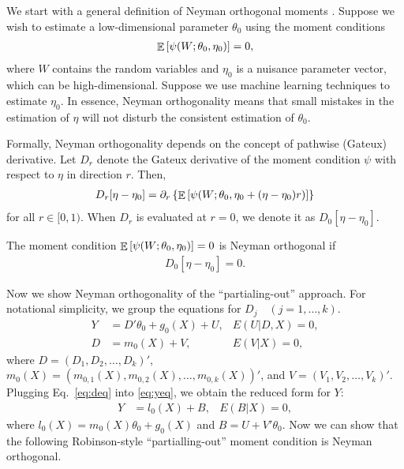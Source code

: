 \documentclass[11pt]{article}
\begin{document}
We start with a general definition of Neyman orthogonal moments  \cite[see, e.g.,][Definition 2.1]{cherno/etal:18}. Suppose we wish to estimate a low-dimensional parameter $\theta_0$ using the moment
conditions
\begin{align}
  \mathop{\mathbb{E}} \left [ \psi(W; \theta_0, \eta_0) \right ] = 0,
\end{align}
where $W$ contains the random variables and  $\eta_0$ is a nuisance parameter vector, which can be high-dimensional. Suppose we
use machine learning techniques to estimate $\eta_0$. In essence,  Neyman orthogonality means that
small mistakes in the estimation of $\eta$ will not disturb the consistent
estimation of $\theta_0$.

Formally, Neyman orthogonality depends on the concept of pathwise (Gateux)
derivative. Let $D_r$ denote the Gateux derivative of the moment condition $\psi$ with respect to $\eta$ in direction $r$. Then, 
\begin{align}
  D_r [\eta - \eta_0] = \partial_r \left\{ 
    	\mathop{\mathbb{E}} \left [  \psi(W; \theta_0, \eta_0 + (\eta - \eta_0)r)  \right ]
  \right \}
\end{align}
for all $r \in [0, 1)$.  When $D_r$ is evaluated at $r=0$, we denote it as
  $D_0[\eta - \eta_0]$.
\begin{defi}
The moment condition $\mathop{\mathbb{E}} \left [ \psi(W; \theta_0, \eta_0) \right ] = 0$ is Neyman orthogonal if 
\begin{align*}
  D_0[\eta - \eta_0] = 0.
\end{align*}
\end{defi}



Now we show Neyman orthogonality of the ``partialing-out'' approach. 
For notational simplicity, we group the equations for $D_j \quad (j=1,
\ldots, k)$. 
\begin{align}
	Y &= D' \theta_0 + g_0(X) + U, & E(U |D, X) = 0, \label{eq:yeq} \\ 
	D &= m_{0}(X) + V, & E(V|X) = 0, \label{eq:deq}
\end{align}
where $D = (D_1, D_2, \ldots, D_{k})'$, 
$m_0(X) = (m_{0, 1}(X), m_{0, 2}(X), \ldots, m_{0, k}(X))'$, and $V = (V_1,
V_2, \ldots, V_{k})'$. 
Plugging  Eq.~\ref{eq:deq} into \ref{eq:yeq}, we obtain the reduced form for
$Y$:
\begin{align}
	Y &= l_0(X) + B, & E(B | X) = 0,
\end{align}
where $l_0(X) = m_0(X)\theta_0 + g_0(X)$ and $B = U + V'\theta_0$.
Now we can show that the following Robinson-style ``partialling-out'' moment
condition is Neyman orthogonal.
\end{document}
